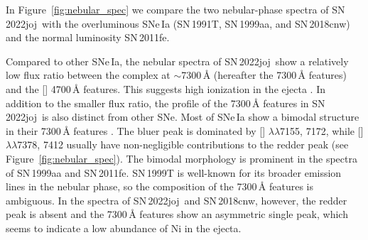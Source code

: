\documentclass[twocolumn]{aastex631}
\newcommand{\sn}{SN\,2022joj}
\newcommand{\chang}[1]{\textcolor{blue}{[Chang: #1]}}
\begin{document}
\begin{CJK*}{UTF8}{gbsn}
In Figure~\ref{fig:nebular_spec} we compare the two nebular-phase spectra of \sn\ with the overluminous SNe\,Ia (SN\,1991T, SN\,1999aa, and SN\,2018cnw) and the normal luminosity SN\,2011fe.

Compared to other SNe\,Ia, the nebular spectra of \sn\ show a relatively low flux ratio between the complex at $\sim$7300\,\r{A} (hereafter the 7300\,\r{A} features) and the [] 4700\,\r{A} features. This suggests high ionization in the ejecta \citep{Wilk_2020}. In addition to the smaller flux ratio, the profile of the 7300\,\r{A} features in \sn\ is also distinct from other SNe. Most of SNe\,Ia show a bimodal structure in their 7300\,\r{A} features \citep[e.g.,][]{Graham_2017,Maguire_2018}. The bluer peak is dominated by [] $\lambda\lambda$7155, 7172, while [] $\lambda\lambda$7378, 7412 usually have non-negligible contributions to the redder peak (see Figure~\ref{fig:nebular_spec}). The bimodal morphology is prominent in the spectra of SN\,1999aa and SN\,2011fe. SN\,1999T is well-known for its broader emission lines in the nebular phase, so the composition of the 7300\,\r{A} features is ambiguous. In the spectra of \sn\ and SN\,2018cnw, however, the redder peak is absent and the 7300\,\r{A} features show an asymmetric single peak, which seems to indicate a low abundance of Ni in the ejecta.



\end{CJK*}
\end{document}
